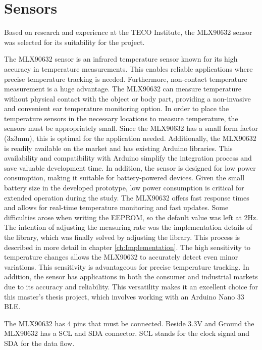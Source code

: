 
\section{Sensors}
\label{ch:Design:Prototype:Sensors}

Based on research and experience at the TECO Institute, the MLX90632 sensor was selected for its suitability for the project.

The MLX90632 sensor is an infrared temperature sensor known for its high accuracy in temperature measurements. This enables reliable applications where precise temperature tracking is needed.
Furthermore, non-contact temperature measurement is a huge advantage. 
The MLX90632 can measure temperature without physical contact with the object or body part, providing a non-invasive and convenient ear temperature monitoring option.
In order to place the temperature sensors in the necessary locations to measure temperature, the sensors must be appropriately small. 
Since the MLX90632 has a small form factor (3x3mm), this is optimal for the application needed.
Additionally, the MLX90632 is readily available on the market and has existing Arduino libraries. 
This availability and compatibility with Arduino simplify the integration process and save valuable development time.
In addition, the sensor is designed for low power consumption, making it suitable for battery-powered devices. 
Given the small battery size in the developed prototype, low power consumption is critical for extended operation during the study.
The MLX90632 offers fast response times and allows for real-time temperature monitoring and fast updates. 
Some difficulties arose when writing the EEPROM, so the default value was left at 2Hz.
The intention of adjusting the measuring rate was the implementation details of the library, which was finally solved by adjusting the library. 
This process is described in more detail in chapter \ref{ch:Implementation}.
The high sensitivity to temperature changes allows the MLX90632 to accurately detect even minor variations. 
This sensitivity is advantageous for precise temperature tracking.
In addition, the sensor has applications in both the consumer and industrial markets due to its accuracy and reliability. 
This versatility makes it an excellent choice for this master's thesis project, which involves working with an Arduino Nano 33 BLE.

The MLX90632 has 4 pins that must be connected. 
Beside 3.3V and Ground the MLX90632 has a SCL and SDA connector. 
SCL stands for the clock signal and SDA for the data flow.

